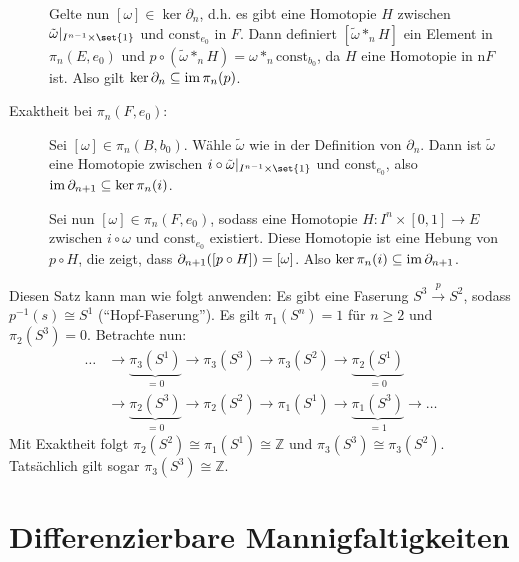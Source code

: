 \begin{beweis}
\begin{description}
		Gelte nun $[\omega] \in \ker \partial_n$, d.h. es gibt eine Homotopie $H$ zwischen $\tilde{\omega}|_{I^{n-1} \times\set{1}}$ und $\mathrm{const}_{e_0}$ in $F$.
		Dann definiert $[\tilde{\omega} *_n H]$ ein Element in $\pi_n(E,e_0)$ und $p \circ (\tilde{\omega} *_n H) = \omega *_n \mathrm{const}_{b_0}$, da $H$ eine Homotopie in n$F$ ist. 
		Also gilt $\ker \partial_n \subseteq \operatorname{im} \pi_n(p)$.
		\item[Exaktheit bei $\pi_n(F, e_0)$:] Sei $[\omega] \in \pi_n(B,b_0)$. 
		Wähle $\tilde{\omega}$ wie in der Definition von $\partial_n$. 
		Dann ist $\tilde{\omega}$ eine Homotopie zwischen $i \circ \tilde{\omega} |_{I^{n-1} \times \set{1}}$ und $\mathrm{const}_{e_0}$, also $\operatorname{im} \partial_{n+1} \subseteq \ker \pi_n(i)$.
	
		Sei nun $[\omega] \in \pi_n(F,e_0)$, sodass eine Homotopie $H \colon I^n \times [0,1] \to E$ zwischen $i \circ \omega$ und $\mathrm{const}_{e_0}$ existiert. 
		Diese Homotopie ist eine Hebung von $p \circ H$, die zeigt, dass $\partial_{n+1} \enbrace*{ [p \circ H]} = [\omega]$. 
		Also $\ker \pi_n(i) \subseteq \operatorname{im} \partial_{n+1}$. \qedhere
	\end{description}
\end{beweis}

Diesen Satz kann man wie folgt anwenden:
Es gibt eine Faserung $S^3 \xrightarrow{p} S^2$, sodass $p^{-1}(s) \cong S^1$ (\enquote{Hopf-Faserung}). 
Es gilt $\pi_1(S^n)= 1$ für $n \ge 2$ und $\pi_2(S^3)= 0$.
Betrachte nun:
\begin{align*}
	\ldots  &\longrightarrow \underbrace{\pi_3(S^1)}_{=0} \longrightarrow \pi_3(S^3) \longrightarrow \pi_3(S^2) \longrightarrow \underbrace{\pi_2(S^1)}_{=0} \\
	&\longrightarrow \underbrace{\pi_2(S^3)}_{=0} \longrightarrow \pi_2(S^2) \longrightarrow \pi_1(S^1) \longrightarrow \underbrace{\pi_1(S^3)}_{=1} \longrightarrow \ldots 
\end{align*}
Mit Exaktheit folgt $\pi_2(S^2) \cong \pi_1(S^1) \cong \mathbb{Z}$ und $\pi_3(S^3) \cong \pi_3(S^2)$. 
Tatsächlich gilt sogar $\pi_3(S^3) \cong \mathbb{Z}$.

\newpage
\section{Differenzierbare Mannigfaltigkeiten} %
\label{sec:differenzierbare_mannigfaltigkeiten}

